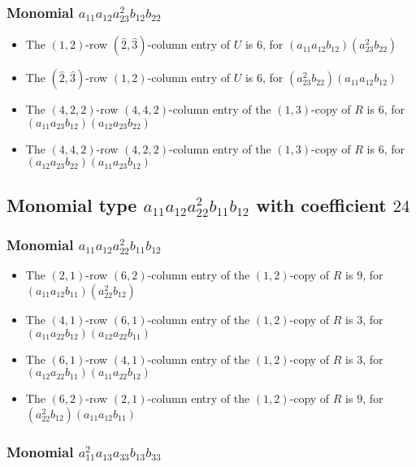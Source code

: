\documentclass{article}
\begin{document}
\subsubsection{Monomial $ a_{11} a_{12} a_{23}^{2} b_{12} b_{22} $}

\begin{itemize}
\item The $ \left(1, 2\right) $-row $ (\hat{2}, \hat{3}) $-column entry of $U$ is $ 6 $, for $( a_{11} a_{12} b_{12} )( a_{23}^{2} b_{22} )$ 
\item The $(\hat{2}, \hat{3})$-row $ \left(1, 2\right) $-column entry of $U$ is $ 6 $, for $( a_{23}^{2} b_{22} )( a_{11} a_{12} b_{12} )$ 
\item The $(4, 2, 2)$-row $(4, 4, 2)$-column entry of the $ \left(1, 3\right) $-copy of $R$ is $ 6 $, for $( a_{11} a_{23} b_{12} )( a_{12} a_{23} b_{22} )$ 
\item The $(4, 4, 2)$-row $(4, 2, 2)$-column entry of the $ \left(1, 3\right) $-copy of $R$ is $ 6 $, for $( a_{12} a_{23} b_{22} )( a_{11} a_{23} b_{12} )$ 
\end{itemize}
\subsection{Monomial type $ a_{11} a_{12} a_{22}^{2} b_{11} b_{12} $ with coefficient $ 24 $}

\subsubsection{Monomial $ a_{11} a_{12} a_{22}^{2} b_{11} b_{12} $}

\begin{itemize}
\item The $(2, 1)$-row $(6, 2)$-column entry of the $ \left(1, 2\right) $-copy of $R$ is $ 9 $, for $( a_{11} a_{12} b_{11} )( a_{22}^{2} b_{12} )$ 
\item The $(4, 1)$-row $(6, 1)$-column entry of the $ \left(1, 2\right) $-copy of $R$ is $ 3 $, for $( a_{11} a_{22} b_{12} )( a_{12} a_{22} b_{11} )$ 
\item The $(6, 1)$-row $(4, 1)$-column entry of the $ \left(1, 2\right) $-copy of $R$ is $ 3 $, for $( a_{12} a_{22} b_{11} )( a_{11} a_{22} b_{12} )$ 
\item The $(6, 2)$-row $(2, 1)$-column entry of the $ \left(1, 2\right) $-copy of $R$ is $ 9 $, for $( a_{22}^{2} b_{12} )( a_{11} a_{12} b_{11} )$ 
\end{itemize}
\subsubsection{Monomial $ a_{11}^{2} a_{13} a_{33} b_{13} b_{33} $}
\end{document}
